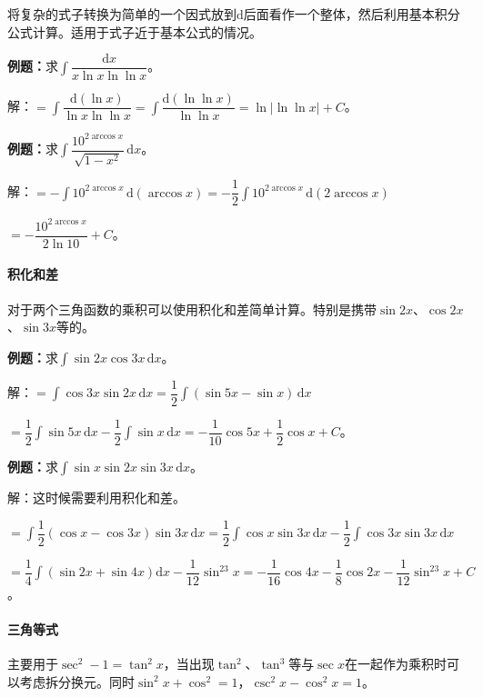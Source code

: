 \documentclass[UTF8, 12pt]{ctexart}
\begin{document}
将复杂的式子转换为简单的一个因式放到$\textrm{d}$后面看作一个整体，然后利用基本积分公式计算。适用于式子近于基本公式的情况。

\textbf{例题：}求$\displaystyle{\int\dfrac{\textrm{d}x}{x\ln x\ln\ln x}}$。 \medskip

解：$=\displaystyle{\int\dfrac{\textrm{d}(\ln x)}{\ln x\ln\ln x}}=\displaystyle{\int\dfrac{\textrm{d}(\ln\ln x)}{\ln\ln x}}=\ln\vert\ln\ln x\vert+C$。\medskip

\textbf{例题：}求$\displaystyle{\int\dfrac{10^{2\arccos x}}{\sqrt{1-x^2}}\,\textrm{d}x}$。

解：$=-\displaystyle{\int10^{2\arccos x}\,\textrm{d}(\arccos x)}=-\dfrac{1}{2}\displaystyle{\int10^{2\arccos x}\,\textrm{d}(2\arccos x)}$

$=-\dfrac{10^{2\arccos x}}{2\ln10}+C$。

\paragraph{积化和差} \leavevmode \medskip

对于两个三角函数的乘积可以使用积化和差简单计算。特别是携带$\sin2x$、$\cos2x$、$\sin3x$等的。

\textbf{例题：}求$\displaystyle{\int\sin2x\cos3x\,\textrm{d}x}$。

解：$=\displaystyle{\int\cos3x\sin2x\,\textrm{d}x=\dfrac{1}{2}\int(\sin5x-\sin x)\,\textrm{d}x}$

$=\dfrac{1}{2}\int\sin5x\,\textrm{d}x-\dfrac{1}{2}\int\sin x\,\textrm{d}x=-\dfrac{1}{10}\cos5x+\dfrac{1}{2}\cos x+C$。

\textbf{例题：}求$\int\sin x\sin2x\sin3x\,\textrm{d}x$。

解：这时候需要利用积化和差。

$=\displaystyle{\int\dfrac{1}{2}(\cos x-\cos3x)\sin3x\,\textrm{d}x=\dfrac{1}{2}\int\cos x\sin3x\,\textrm{d}x-\dfrac{1}{2}\int\cos3x\sin3x\,\textrm{d}x}$

$=\dfrac{1}{4}\int(\sin2x+\sin4x)\textrm{d}x-\dfrac{1}{12}\sin^23x=-\dfrac{1}{16}\cos4x-\dfrac{1}{8}\cos2x-\dfrac{1}{12}\sin^23x+C$。

\paragraph{三角等式} \leavevmode \medskip

主要用于$\sec^2-1=\tan^2x$，当出现$\tan^2$、$\tan^3$等与$\sec x$在一起作为乘积时可以考虑拆分换元。同时$\sin^2x+\cos^2=1$，$\csc^2x-\cos^2x=1$。
\end{document}
